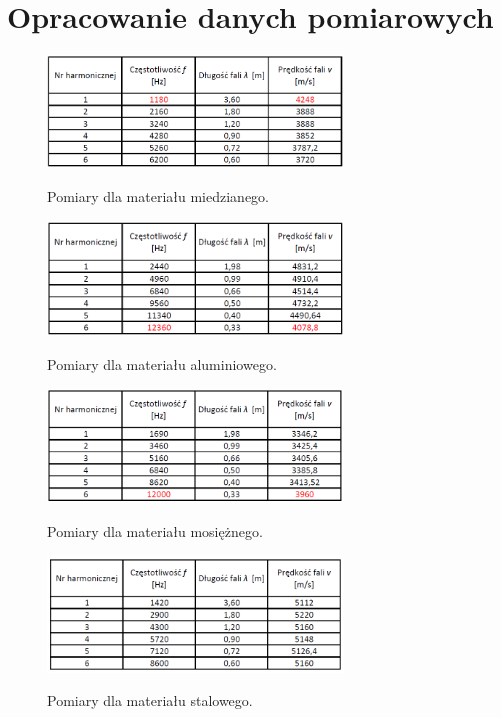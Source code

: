 \documentclass [a4paper,11pt]{article}
\begin{document}
	\section{Opracowanie danych pomiarowych}\label{sec:opr}
	\renewcommand*{\figurename}{Tabela} 
	\setcounter{figure}{0}
	\begin{figure}[!h]
		\centering
		\caption{Pomiary dla materiału miedzianego.}
		\includegraphics[width=0.7\textwidth]{tabmiedz}
		\label{fig:tabmiedz}
	\end{figure}
	\begin{figure}[!h]
		\centering
		\caption{Pomiary dla materiału aluminiowego.}
		\includegraphics[width=0.7\textwidth]{tabaluminium}
		\label{fig:tabaluminium}
	\end{figure}
	\begin{figure}[!h]
		\centering
		\caption{Pomiary dla materiału mosiężnego.}
		\includegraphics[width=0.7\textwidth]{tabmosiadz}
		\label{fig:tabmosiadz}
	\end{figure}
	\begin{figure}[!h]
		\centering
		\caption{Pomiary dla materiału stalowego.}
		\includegraphics[width=0.7\textwidth]{tabstal}
		\label{fig:tabstal}
	\end{figure}
\end{document}
